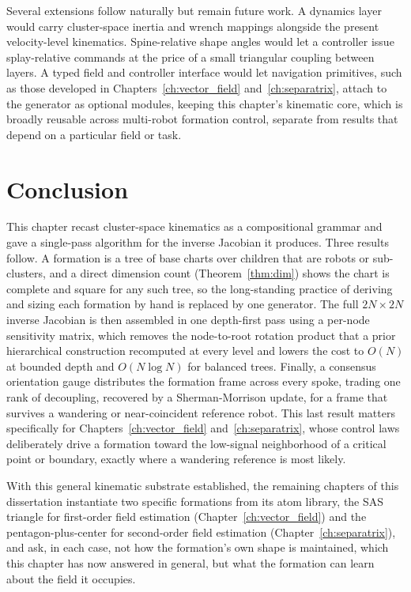 \documentclass[12pt, letterpaper, oneside]{report}
\begin{document}
Several extensions follow naturally but remain future work. A dynamics
layer would carry cluster-space inertia and wrench mappings alongside the
present velocity-level kinematics. Spine-relative shape angles would let a
controller issue splay-relative commands at the price of a small triangular
coupling between layers. A typed field and controller interface would let
navigation primitives, such as those developed in
Chapters~\ref{ch:vector_field} and~\ref{ch:separatrix}, attach to the
generator as optional modules, keeping this chapter's kinematic core, which
is broadly reusable across multi-robot formation control, separate from
results that depend on a particular field or task.

\section{Conclusion}
\label{sec:cb_conclusion}

This chapter recast cluster-space kinematics as a compositional grammar and
gave a single-pass algorithm for the inverse Jacobian it produces. Three
results follow. A formation is a tree of base charts over children that are
robots or sub-clusters, and a direct dimension count
(Theorem~\ref{thm:dim}) shows the chart is complete and square for any such
tree, so the long-standing practice of deriving and sizing each formation
by hand is replaced by one generator. The full $2N\times2N$ inverse Jacobian
is then assembled in one depth-first pass using a per-node sensitivity
matrix, which removes the node-to-root rotation product that a prior
hierarchical construction recomputed at every level and lowers the cost to
$O(N)$ at bounded depth and $O(N\log N)$ for balanced trees. Finally, a
consensus orientation gauge distributes the formation frame across every
spoke, trading one rank of decoupling, recovered by a Sherman-Morrison
update, for a frame that survives a wandering or near-coincident reference
robot. This last result matters specifically for
Chapters~\ref{ch:vector_field} and~\ref{ch:separatrix}, whose control laws
deliberately drive a formation toward the low-signal neighborhood of a
critical point or boundary, exactly where a wandering reference is most
likely.

With this general kinematic substrate established, the remaining chapters
of this dissertation instantiate two specific formations from its atom
library, the SAS triangle for first-order field estimation
(Chapter~\ref{ch:vector_field}) and the pentagon-plus-center for
second-order field estimation (Chapter~\ref{ch:separatrix}), and ask, in
each case, not how the formation's own shape is maintained, which this
chapter has now answered in general, but what the formation can learn about
the field it occupies.
\end{document}

